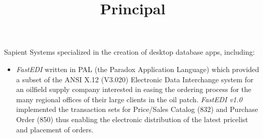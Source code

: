 \documentclass[line,margin]{res}
\begin{document}
\begin{resume}
\title{ Principal }
\begin{position}
Sapient Systems specialized in the creation of desktop database apps, including:
\begin{itemize}
\item {\it FastEDI} written in PAL (the Paradox Application Language) which
	provided a subset of the
	ANSI X.12 (V3.020) Electronic Data Interchange system for an
	oilfield supply company interested in easing the ordering process for
	the many regional offices of their large clients in the oil patch.
	{\it FastEDI v1.0} implemented
	the transaction sets for Price/Sales Catalog (832) and
	Purchase Order (850) thus enabling the electronic distribution
	of the latest pricelist and placement of orders.
\end{itemize}
\end{position}


\end{resume}
\end{document}
